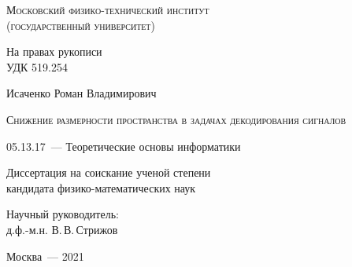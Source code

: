 \thispagestyle{empty}


\begin{titlepage}
	\begin{center}
		\textsc{Московский физико-технический институт \\ (государственный университет)}\\
	\end{center}
	\vspace{1.5cm}
	\begin{flushright}
		{На правах рукописи\\
			УДК 519.254}
	\end{flushright}
	\vspace{1.5cm}
	\begin{center}
		{Исаченко Роман Владимирович}
		\par
		\vspace{2cm}
		\textsc{Снижение размерности пространства в задачах декодирования сигналов}
		\par
		\vspace{2cm}
		{05.13.17~--- Теоретические основы информатики}
		\par
		\vspace{2cm}
		{Диссертация на соискание ученой степени\\
			кандидата физико-математических наук}
	\end{center}
	\vspace{2cm}
	\hfill\parbox{8,4cm}{Научный руководитель:
		\\д.ф.-м.н. В.\,В.\,Стрижов}
	\par
	\vspace{3.5cm}
	\begin{center}
		{Москва~--- 2021}
	\end{center}
\end{titlepage}